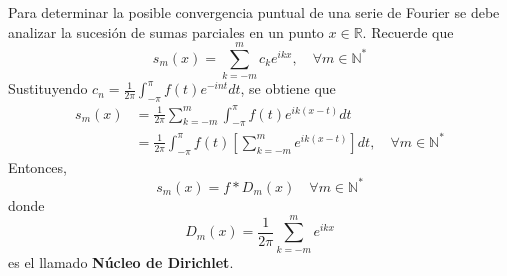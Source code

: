 \documentclass[12pt]{report}
\theoremstyle{largebreak}
\begin{document}
    Para determinar la posible convergencia puntual de una serie de Fourier se debe analizar la sucesión de sumas parciales en un punto $x\in\mathbb{R}$. Recuerde que 
    \begin{equation*}
        s_m(x)=\sum_{ k=-m}^m c_ke^{ ikx},\quad\forall m\in\mathbb{N}^*
    \end{equation*}
    Sustituyendo $c_n=\frac{1}{2\pi}\int_{-\pi}^\pi f(t)e^{ -int}dt$, se obtiene que
    \begin{equation*}
        \begin{split}
            s_m(x)&=\frac{1}{2\pi}\sum_{ k=-m}^m\int_{-\pi}^\pi f(t)e^{ ik(x-t)}dt\\
            &=\frac{1}{2\pi}\int_{-\pi}^\pi f(t)\left[\sum_{ k=-m}^m e^{ ik(x-t)}\right]dt ,\quad\forall m\in\mathbb{N}^*
        \end{split}
    \end{equation*}
    Entonces,
    \begin{equation*}
        s_m(x)=f*D_m(x)\quad\forall m\in\mathbb{N}^*
    \end{equation*}
    donde
    \begin{equation*}
        D_m(x)=\frac{1}{2\pi}\sum_{ k=-m}^m e^{ ikx}
    \end{equation*}
    es el llamado \textbf{Núcleo de Dirichlet}.
\end{document}
